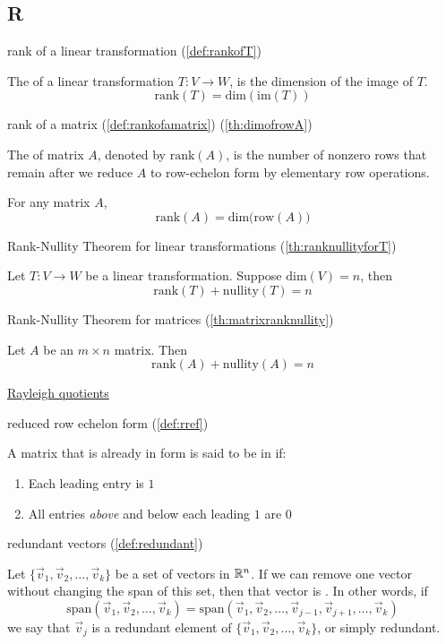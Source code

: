 \documentclass{ximera}
\begin{document}
\subsection*{R}


rank of a linear transformation (\ref{def:rankofT})
\begin{expandable}
    The  of a linear transformation $T:V\rightarrow W$, is the dimension of the image of $T$.
$$\mbox{rank}(T)=\mbox{dim}(\mbox{im}(T))$$
\end{expandable}

rank of a matrix (\ref{def:rankofamatrix}) (\ref{th:dimofrowA})
\begin{expandable}
    The  of matrix $A$, denoted by $\mbox{rank}(A)$, is the number of nonzero rows that remain after we reduce $A$ to row-echelon form by elementary row operations.

    For any matrix $A$,  
$$\mbox{rank}(A)=\mbox{dim}\Big(\mbox{row}(A)\Big)$$

\end{expandable}

Rank-Nullity Theorem for linear transformations (\ref{th:ranknullityforT})
\begin{expandable}
    Let $T:V\rightarrow W$ be a linear transformation.  Suppose $\mbox{dim}(V)=n$, then
$$\mbox{rank}(T)+\mbox{nullity}(T)=n$$
\end{expandable}

Rank-Nullity Theorem for matrices (\ref{th:matrixranknullity})
\begin{expandable}
    Let $A$ be an $m\times n$ matrix.  Then 
$$\mbox{rank}(A)+\mbox{nullity}(A)=n$$
\end{expandable}

\href{https://ximera.osu.edu/oerlinalg/LinearAlgebra/EIG-0070/main}{Rayleigh quotients}

reduced row echelon form (\ref{def:rref})
\begin{expandable}
    A matrix that is already in  form is said to be in  if:
\begin{enumerate}
\item Each leading entry is $1$
\item All entries {\it above} and below each leading $1$ are $0$
\end{enumerate}
\end{expandable}

redundant vectors (\ref{def:redundant})
\begin{expandable}
    Let $\{\vec{v}_1,\vec{v}_2,\dots,\vec{v}_k\}$ be a set of vectors in $\mathbb{R}^n$.  If we can remove one vector without changing the span of this set, then that vector is .  In other words, if $$\mbox{span}\left(\vec{v}_1,\vec{v}_2,\dots,\vec{v}_k\right)=\mbox{span}\left(\vec{v}_1,\vec{v}_2,\dots,\vec{v}_{j-1},\vec{v}_{j+1},\dots,\vec{v}_k\right)$$ we say that $\vec{v}_j$ is a redundant element of $\{\vec{v}_1,\vec{v}_2,\dots,\vec{v}_k\}$, or simply redundant.
\end{expandable}
\end{document}
